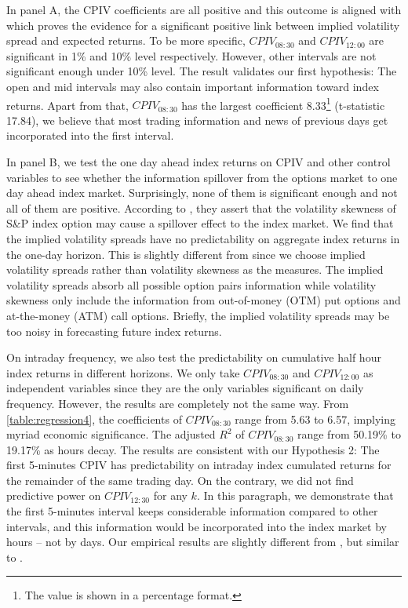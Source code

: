 In panel A, the CPIV coefficients are all positive and this outcome is aligned with \textcite{cremers2010deviations} which proves the evidence for a significant positive link between implied volatility spread and expected returns. To be more specific, $CPIV_{08:30}$ and $CPIV_{12:00}$ are significant in 1\% and 10\% level respectively. However, other intervals are not significant enough under 10\% level. The result validates our first hypothesis: The open and mid intervals may also contain important information toward index returns. Apart from that, $CPIV_{08:30}$ has the largest coefficient 8.33\footnote{The value is shown in a percentage format.} (t-statistic 17.84), we believe that most trading information and news of previous days get incorporated into the first interval.

In panel B, we test the one day ahead index returns on CPIV and other control variables to see whether the information spillover from the options market to one day ahead index market. Surprisingly, none of them is significant enough and not all of them are positive. According to \textcite{atilgan2015implied}, they assert that the volatility skewness of S\&P index option may cause a spillover effect to the index market. We find that the implied volatility spreads have no predictability on aggregate index returns in the one-day horizon. This is slightly different from \textcite{atilgan2015implied} since we choose implied volatility spreads rather than volatility skewness as the measures. The implied volatility spreads absorb all possible option pairs information while volatility skewness only include the information from out-of-money (OTM) put options and at-the-money (ATM) call options. Briefly, the implied volatility spreads may be too noisy in forecasting future index returns.  

On intraday frequency, we also test the predictability on cumulative half hour index returns in different horizons. We only take $CPIV_{08:30}$ and $CPIV_{12:00}$ as independent variables since they are the only variables significant on daily frequency. However, the results are completely not the same way. From \autoref{table:regression4}, the coefficients of $CPIV_{08:30}$ range from 5.63 to 6.57, implying myriad economic significance. The adjusted $R^{2}$ of $CPIV_{08:30}$ range from 50.19\% to 19.17\% as hours decay. The results are consistent with our Hypothesis 2: The first 5-minutes CPIV has predictability on intraday index cumulated returns for the remainder of the same trading day. On the contrary, we did not find predictive power on $CPIV_{12:30}$ for any $k$. In this paragraph, we demonstrate that the first 5-minutes interval keeps considerable information compared to other intervals, and this information would be incorporated into the index market by hours -- not by days. Our empirical results are slightly different from \textcite{cremers2010deviations}, but similar to \textcite{kumar1992behavior}. 
   





